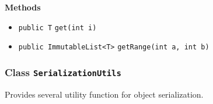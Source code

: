 \textbf{\sffamily Methods}
\begin{itemize}
\item \lstinline|public T| \lstinline|get|\lstinline|(int i)| \\[-0.6em]




\item \lstinline|public ImmutableList<T>| \lstinline|getRange|\lstinline|(int a, int b)| \\[-0.6em]




\end{itemize}

\subsubsection{Class \lstinline|SerializationUtils|}
Provides several utility function for object serialization. \\
\noindent\begin{minipage}[t]{5cm}
\vspace{0.3em}
\hspace*{2em}
\vspace{0.3em}
\end{minipage}





